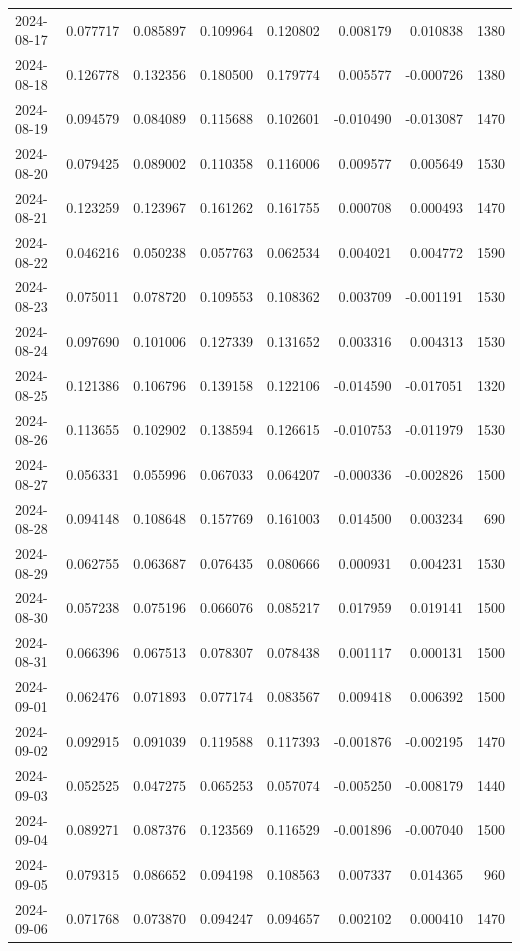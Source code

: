 \begin{tabular}{lrrrrrrr}
2024-08-17 & 0.077717 & 0.085897 & 0.109964 & 0.120802 & 0.008179 & 0.010838 & 1380 \\
2024-08-18 & 0.126778 & 0.132356 & 0.180500 & 0.179774 & 0.005577 & -0.000726 & 1380 \\
2024-08-19 & 0.094579 & 0.084089 & 0.115688 & 0.102601 & -0.010490 & -0.013087 & 1470 \\
2024-08-20 & 0.079425 & 0.089002 & 0.110358 & 0.116006 & 0.009577 & 0.005649 & 1530 \\
2024-08-21 & 0.123259 & 0.123967 & 0.161262 & 0.161755 & 0.000708 & 0.000493 & 1470 \\
2024-08-22 & 0.046216 & 0.050238 & 0.057763 & 0.062534 & 0.004021 & 0.004772 & 1590 \\
2024-08-23 & 0.075011 & 0.078720 & 0.109553 & 0.108362 & 0.003709 & -0.001191 & 1530 \\
2024-08-24 & 0.097690 & 0.101006 & 0.127339 & 0.131652 & 0.003316 & 0.004313 & 1530 \\
2024-08-25 & 0.121386 & 0.106796 & 0.139158 & 0.122106 & -0.014590 & -0.017051 & 1320 \\
2024-08-26 & 0.113655 & 0.102902 & 0.138594 & 0.126615 & -0.010753 & -0.011979 & 1530 \\
2024-08-27 & 0.056331 & 0.055996 & 0.067033 & 0.064207 & -0.000336 & -0.002826 & 1500 \\
2024-08-28 & 0.094148 & 0.108648 & 0.157769 & 0.161003 & 0.014500 & 0.003234 & 690 \\
2024-08-29 & 0.062755 & 0.063687 & 0.076435 & 0.080666 & 0.000931 & 0.004231 & 1530 \\
2024-08-30 & 0.057238 & 0.075196 & 0.066076 & 0.085217 & 0.017959 & 0.019141 & 1500 \\
2024-08-31 & 0.066396 & 0.067513 & 0.078307 & 0.078438 & 0.001117 & 0.000131 & 1500 \\
2024-09-01 & 0.062476 & 0.071893 & 0.077174 & 0.083567 & 0.009418 & 0.006392 & 1500 \\
2024-09-02 & 0.092915 & 0.091039 & 0.119588 & 0.117393 & -0.001876 & -0.002195 & 1470 \\
2024-09-03 & 0.052525 & 0.047275 & 0.065253 & 0.057074 & -0.005250 & -0.008179 & 1440 \\
2024-09-04 & 0.089271 & 0.087376 & 0.123569 & 0.116529 & -0.001896 & -0.007040 & 1500 \\
2024-09-05 & 0.079315 & 0.086652 & 0.094198 & 0.108563 & 0.007337 & 0.014365 & 960 \\
2024-09-06 & 0.071768 & 0.073870 & 0.094247 & 0.094657 & 0.002102 & 0.000410 & 1470 \\

\end{tabular}
